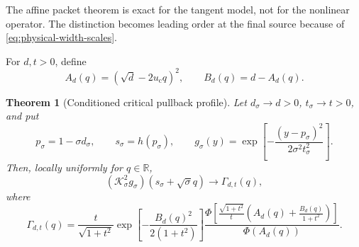 \documentclass[11pt]{article}
\newtheorem{theorem}{Theorem}[section]
\theoremstyle{definition}
\theoremstyle{remark}
\newcommand{\R}{\mathbb R}
\newcommand{\uc}{u_{\mathrm c}}
\newcommand{\cK}{\mathcal K}
\begin{document}
The affine packet theorem is exact for the tangent model, not for the
nonlinear operator.  The distinction becomes leading order at the final
source because of \eqref{eq:physical-width-scales}.

For $d,t>0$, define
\begin{equation}\label{eq:A-B}
 A_d(q)=(\sqrt d-2\uc q)^2,
 \qquad
 B_d(q)=d-A_d(q).
\end{equation}

\begin{theorem}[Conditioned critical pullback profile]
\label{thm:critical-profile}
Let $d_\sigma\to d>0$, $t_\sigma\to t>0$, and put
\begin{equation}\label{eq:critical-scaling}
 p_\sigma=1-\sigma d_\sigma,
 \qquad
 s_\sigma=h(p_\sigma),
 \qquad
 g_\sigma(y)=
 \exp\!\left[-\frac{(y-p_\sigma)^2}{2\sigma^2t_\sigma^2}\right].
\end{equation}
Then, locally uniformly for $q\in\R$,
\begin{equation}\label{eq:profile-limit}
 (\cK_\sigma^2g_\sigma)(s_\sigma+\sqrt\sigma q)
 \longrightarrow \Gamma_{d,t}(q),
\end{equation}
where
\begin{equation}\label{eq:Gamma}
 \boxed{
 \Gamma_{d,t}(q)=
 \frac{t}{\sqrt{1+t^2}}
 \exp\!\left[-\frac{B_d(q)^2}{2(1+t^2)}\right]
 \frac{
 \Phi\!\left[
 \frac{\sqrt{1+t^2}}{t}
 \left(A_d(q)+\frac{B_d(q)}{1+t^2}\right)
 \right]}
 {\Phi(A_d(q))}.}
\end{equation}
\end{theorem}
\end{document}

